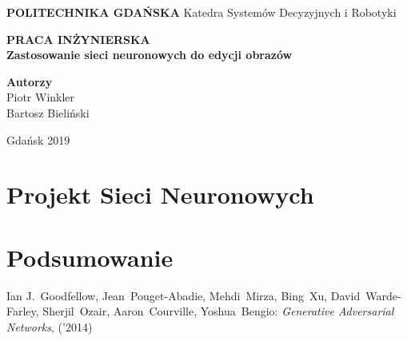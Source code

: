 \documentclass[12pt]{article}
\begin{document}



\begin{titlepage}
  \begin{center}

    \vspace*{1cm}
    \Huge
    \textbf{POLITECHNIKA GDAŃSKA}
    \vspace{0.5cm}
    \LARGE
    Katedra Systemów Decyzyjnych i Robotyki

    \vspace{1.5cm}
    \textbf{PRACA INŻYNIERSKA}
    \\[0.5cm]
    \textbf{Zastosowanie sieci neuronowych do edycji obrazów}

    \vspace{2.5cm}
    \Large
    \textbf{Autorzy}\\
    Piotr Winkler\\
    Bartosz Bieliński

    \vspace{3.5cm}
    Gdańsk 2019

  \end{center}
\end{titlepage}

\setcounter{page}{2}







\newpage
  \tableofcontents





\section{Projekt Sieci Neuronowych}

\section{Podsumowanie}


\newpage
\begin{thebibliography}{99} %
   Ian J.~Goodfellow, Jean~Pouget-Abadie, Mehdi~Mirza, Bing~Xu, David~Warde-Farley, Sherjil~Ozair, Aaron~Courville, Yoshua~Bengio:
  \emph{Generative Adversarial Networks}, ('2014)
\end{thebibliography}


\end{document}
